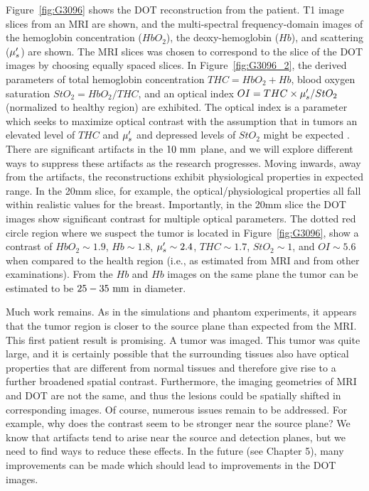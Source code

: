 \begin{enumerate}[noitemsep]
Figure~\ref{fig:G3096} shows the DOT reconstruction from the patient. T1 image slices from an MRI are shown, and the multi-spectral frequency-domain images of the hemoglobin concentration ($HbO_2$), the deoxy-hemoglobin ($Hb$), and scattering ($\mu_s^{\prime}$) are shown. The MRI slices was chosen to correspond to the slice of the DOT images by choosing equally spaced slices. In Figure~\ref{fig:G3096_2}, the derived parameters of total hemoglobin concentration $THC=HbO_2+Hb$, blood oxygen saturation $StO_2=HbO_2/THC$, and an optical index $OI=THC\times\mu_s^{\prime}/StO_2$ (normalized to healthy region) are exhibited. The optical index is a parameter which seeks to maximize optical contrast with the assumption that in tumors an elevated level of $THC$ and $\mu_s^{\prime}$ and depressed levels of $StO_2$ might be expected \cite{Tromberg2005,Cerussi2006,Choe2009}. There are significant artifacts in the $10~\rm{mm}$ plane, and we will explore different ways to suppress these artifacts as the research progresses. Moving inwards, away from the artifacts, the reconstructions exhibit physiological properties in expected range. In the 20mm slice, for example, the optical/physiological properties all fall within realistic values for the breast. Importantly, in the 20mm slice the DOT images show significant contrast for multiple optical parameters. The dotted red circle region where we suspect the tumor is located in Figure~\ref{fig:G3096}, show a contrast of $HbO_2\sim1.9$, $Hb\sim1.8$, $\mu_s^{\prime}\sim2.4$, $THC\sim1.7$, $StO_2\sim1$, and $OI\sim5.6$ when compared to the health region (i.e., as estimated from MRI and from other examinations). From the $Hb$ and $Hb$ images on the same plane the tumor can be estimated to be $25-35~\rm{mm}$ in diameter.

Much work remains. As in the simulations and phantom experiments, it appears that the tumor region is closer to the source plane than expected from the MRI. This first patient result is promising.  A tumor was imaged. This tumor was quite large, and it is certainly possible that the surrounding tissues also have optical properties that are different from normal tissues and therefore give rise to a further broadened spatial contrast. Furthermore, the imaging geometries of MRI and DOT are not the same, and thus the lesions could be spatially shifted in corresponding images. Of course, numerous issues remain to be addressed. For example, why does the contrast seem to be stronger near the source plane? We know that artifacts tend to arise near the source and detection planes, but we need to find ways to reduce these effects. In the future (see Chapter 5), many improvements can be made which should lead to improvements in the DOT images.
\floatbarrier

\end{enumerate}
